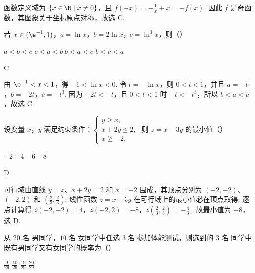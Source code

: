 \begin{solution}
函数定义域为 \(\{x\in\R\mid x\ne0\}\)，且 \(f(-x)=-\frac{1}{x}+x=-f(x)\). 因此 \(f\) 是奇函数，其图象关于坐标原点对称，故选 C.
\end{solution}

\begin{problem}
若 \(x \in (\e^{-1}, 1)\)，\(a = \ln x\)，\(b = 2 \ln x\)，\(c = \ln^3 x\)，则（\quad）

\choices
    {\(a < b < c\)}
    {\(c < a < b\)}
    {\(b < a < c\)}
    {\(b < c < a\)}
\end{problem}

\begin{answer}
C
\end{answer}

\begin{solution}
由 \(\e^{-1}<x<1\)，得 \(-1<\ln x<0\). 令 \(t=-\ln x\)，则 \(0<t<1\)，并且 \(a=-t\)，\(b=-2t\)，\(c=-t^3\). 因为 \(-2t<-t\)，且 \(0<t<1\) 时 \(-t<-t^3\)，所以 \(b<a<c\)，故选 C.
\end{solution}

\begin{problem}
设变量 \(x\)，\(y\) 满足约束条件：\(\begin{cases}
y \geqslant x,\\
x + 2y \leqslant 2,\\
x \geqslant -2,
\end{cases}\) 则 \(z = x - 3y\) 的最小值（\quad）

\choices
    {\(-2\)}
    {\(-4\)}
    {\(-6\)}
    {\(-8\)}
\end{problem}

\begin{answer}
D
\end{answer}

\begin{solution}
可行域由直线 \(y=x\)、\(x+2y=2\) 和 \(x=-2\) 围成，其顶点分别为 \((-2,-2)\)、\((-2,2)\) 和 \(\left(\frac{2}{3},\frac{2}{3}\right)\). 线性函数 \(z=x-3y\) 在可行域上的最小值必在顶点取得. 逐点计算得 \(z(-2,-2)=4\)，\(z(-2,2)=-8\)，\(z\left(\frac{2}{3},\frac{2}{3}\right)=-\frac{4}{3}\)，故最小值为 \(-8\)，选 D.
\end{solution}

\begin{problem}
从 \(20\text{ 名}\) 男同学，\(10\text{ 名}\) 女同学中任选 \(3\text{ 名}\) 参加体能测试，则选到的 \(3\text{ 名}\) 同学中既有男同学又有女同学的概率为（\quad）

\choices
    {\(\frac{9}{29}\)}
    {\(\frac{10}{29}\)}
    {\(\frac{19}{29}\)}
    {\(\frac{20}{29}\)}
\end{problem}

